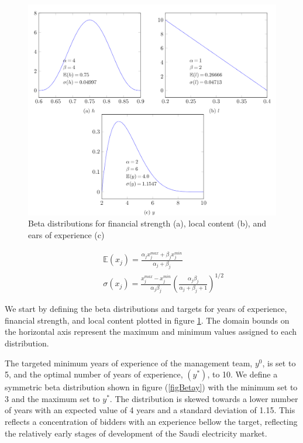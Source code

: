 \documentclass[informs]{informs3}
\begin{document}
\begin{figure}
	\centering 
    \includegraphics[scale=1]{figure1.png}
    \caption{Beta distributions for financial strength (a), local content (b), and ears of experience (c)}
    \label{figBeta}
\end{figure}

\begin{subequations} \label{eqBetaDist}
\begin{align}
	&\qquad \mathbb{E}(x_j) = \frac{\alpha_j x_j^{max}+\beta_j x_j^{min}}{\alpha_j+\beta_j}\label{eqBetaAvg}  \\
    &\qquad \sigma(x_j) = \frac{x_j^{max}-x_j^{min}}{\alpha_j\beta_j}\left(\frac{\alpha_j \beta_j}{\alpha_j+\beta_j+1}\right) ^{1/2}\label{eqBetaStd} 
\end{align}
\end{subequations}

We start by defining the beta distributions and targets for years of experience, financial strength, and local content plotted in figure \ref{figBeta}. The domain bounds on the horizontal axis represent the maximum and minimum values assigned to each distribution. 

The targeted minimum years of experience of the management team, $y^{0}$, is set to 5, and the optimal number of years of experience, $(y^{*})$, to 10. We define a symmetric beta distribution shown in figure (\ref{figBetay}) with the minimum set to 3 and the maximum set to $y^*$. The distribution is skewed towards a lower number of years with an expected value of 4 years and a standard deviation of 1.15. This reflects a concentration of bidders with an experience bellow the target, reflecting the relatively early stages of development of the Saudi electricity market.
\end{document}
